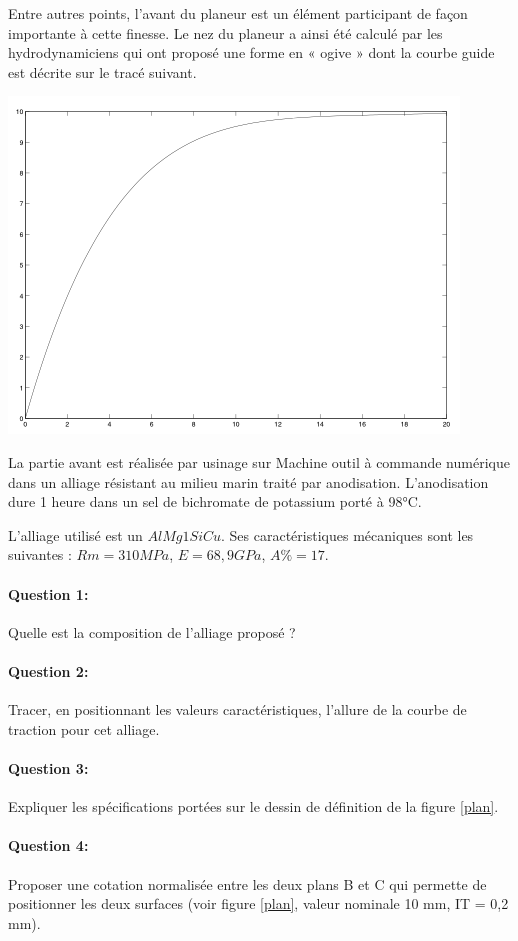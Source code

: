 Entre autres points, l'avant du planeur est un élément participant de façon importante à cette finesse. Le nez du planeur a ainsi été calculé par les hydrodynamiciens qui ont proposé une forme en « ogive » dont la courbe guide est décrite sur le tracé suivant.
\begin{center}
 \includegraphics[width=0.6\linewidth]{img/Hydro.png}
\end{center}

La partie avant est réalisée par usinage sur Machine outil à commande numérique dans un alliage résistant au milieu marin traité par anodisation. L'anodisation dure 1 heure dans un sel de bichromate de potassium porté à 98°C. 

L'alliage utilisé est un $AlMg1SiCu$. Ses caractéristiques mécaniques sont les suivantes : $Rm=310MPa$, 
$E=68,9GPa$, $A\%=17$.

\paragraph{Question 1:} Quelle est la composition de l'alliage proposé ?

\paragraph{Question 2:} Tracer, en positionnant les valeurs caractéristiques, l'allure de la courbe de traction pour cet alliage.

\paragraph{Question 3:} Expliquer les spécifications portées sur le dessin de définition de la figure \ref{plan}.

\paragraph{Question 4:} Proposer une cotation normalisée entre les deux plans B et C qui permette de positionner les deux surfaces (voir figure \ref{plan}, valeur nominale 10 mm, IT = 0,2 mm).

